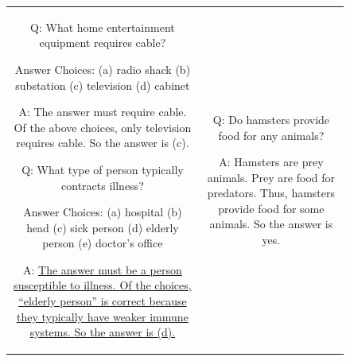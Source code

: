 % 

\begin{figure}[!t]
\centering
\setlength{\tabcolsep}{0pt}

\begin{tabular}{@{}c@{\hspace{0.02\textwidth}}c@{}}

\begin{tcolorbox}[
  breakable=false,
  width=0.45\textwidth,
  height=9cm,
  valign=top
]
{\footnotesize
Q: What home entertainment equipment requires cable?

Answer Choices: (a) radio shack (b) substation
(c) television (d) cabinet

\vspace{0.2em}

A: \textcolor[RGB]{154,245,175}{
The answer must require cable. Of the above choices,
only television requires cable.
}
So the answer is (c).

\vspace{0.5em}

Q: What type of person typically contracts illness?

Answer Choices: (a) hospital (b) head (c) sick person
(d) elderly person (e) doctor's office

\vspace{0.2em}

A: \textcolor[RGB]{154,245,175}{\uline{
The answer must be a person susceptible to illness.
Of the choices, ``elderly person'' is correct because
they typically have weaker immune systems.
}}
\uline{So the answer is (d).}

\par}
\end{tcolorbox}

&

\begin{tcolorbox}[
  breakable=false,
  width=0.45\textwidth,
  height=9cm,
  valign=top
]
{\footnotesize
Q: Do hamsters provide food for any animals?

\vspace{0.2em}

A: \textcolor[RGB]{154,245,175}{
Hamsters are prey animals. Prey are food for predators.
Thus, hamsters provide food for some animals.
}
So the answer is yes.

}
\end{tcolorbox}
\end{tabular}
\end{figure}
